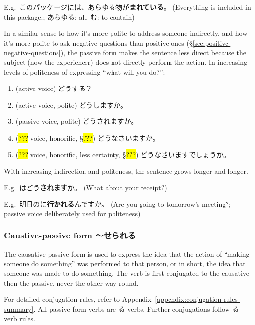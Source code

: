 \documentclass[../nihongo-gakushuu-kyouzai.tex]{subfiles}
\begin{document}
E.g.\ このパッケージには、あらゆる物が\textbf{まれている}。 (Everything is included in this package.; あらゆる: all, む: to contain)

In a similar sense to how it's more polite to address someone indirectly, and how it's more polite to ask negative questions than positive ones (\S\ref{sec:positive-negative-questions}), the passive form makes the sentence less direct because the subject (now the experiencer) does not directly perform the action. In increasing levels of politeness of expressing ``what will you do?'':
\begin{enumerate}[label=\arabic*.]
    \item (active voice) どうする？
    \item (active voice, polite) どうしますか。
    \item (passive voice, polite) どうされますか。
    \item (\hl{???} voice, honorific, \S\hl{???}) どうなさいますか。
    \item (\hl{???} voice, honorific, less certainty, \S\hl{???}) どうなさいますでしょうか。
\end{enumerate}
With increasing indirection and politeness, the sentence grows longer and longer.

E.g.\ はどう\textbf{されます}か。 (What about your receipt?)

E.g.\ 明日のに\textbf{行かれる}んですか。 (Are you going to tomorrow's meeting?; passive voice deliberately used for politeness)


\subsubsection{Caustive-passive form 〜せられる} \label{sec:causative-passive-form}

The causative-passive form is used to express the idea that the action of ``making someone do something'' was performed to that person, or in short, the idea that someone was made to do something. The verb is first conjugated to the causative then the passive, never the other way round.

For detailed conjugation rules, refer to Appendix~\ref{appendix:conjugation-rules-summary}. All passive form verbs are る-verbs. Further conjugations follow る-verb rules.
\end{document}
